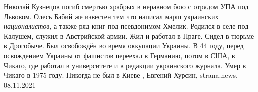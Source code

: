 Николай Кузнецов погиб смертью храбрых в неравном бою с отрядом УПА под
Львовом.  Олесь Бабий же известен тем что написал марш украинских
\emph{националистов}, а также ряд книг под псевдонимом Хмелик. Родился в селе под
Калушем, служил в Австрийской армии. Жил и работал в Праге. Сидел в тюрьме в
Дрогобыче. Был освобождён во время оккупации Украины. В 44 году, перед
освождением Украины от фашистов переехал в Германию, потом в США, в Чикаго, где
работал в университете и в редакции украинского журнала. Умер в Чикаго в 1975
году. Никогда не был в Киеве
, 
Евгений Хурсин, strana.news, 08.11.2021
